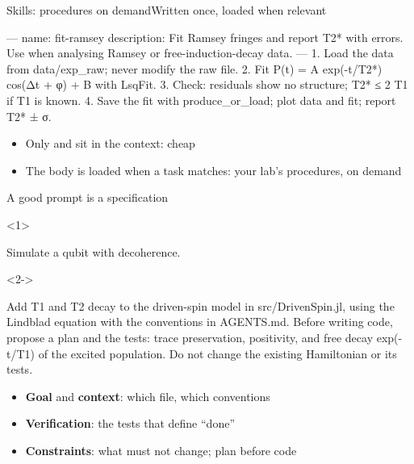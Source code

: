 \begin{frame}[fragile]{Skills: procedures on demand}{Written once, loaded when relevant}
\begin{terminal}[title={\hfill\tiny\color{unibasGrey}\smallcapsline{.claude/skills/fit-ramsey/SKILL.md}}]
---
name: fit-ramsey
description: Fit Ramsey fringes and report T2* with errors. Use when
  analysing Ramsey or free-induction-decay data.
---
1. Load the data from data/exp_raw; never modify the raw file.
2. Fit P(t) = A exp(-t/T2*) cos(Δt + φ) + B with LsqFit.
3. Check: residuals show no structure; T2* ≤ 2 T1 if T1 is known.
4. Save the fit with produce_or_load; plot data and fit; report T2* ± σ.
\end{terminal}
  \begin{itemize}
    \item<2-> Only  and  sit in the context: cheap
    \item<3-> The body is loaded when a task matches: your lab's procedures, on demand
  \end{itemize}
\end{frame}

\begin{frame}[fragile]{A good prompt is a specification}
\begin{onlyenv}<1>
\begin{prompt}
Simulate a qubit with decoherence.
\end{prompt}
\end{onlyenv}
\begin{onlyenv}<2->
\begin{prompt}
Add T1 and T2 decay to the driven-spin model in src/DrivenSpin.jl, using
the Lindblad equation with the conventions in AGENTS.md.
Before writing code, propose a plan and the tests: trace preservation,
positivity, and free decay exp(-t/T1) of the excited population.
Do not change the existing Hamiltonian or its tests.
\end{prompt}
\end{onlyenv}
  \begin{itemize}
    \item<2-> \textbf{Goal} and \textbf{context}: which file, which conventions
    \item<3-> \textbf{Verification}: the tests that define ``done''
    \item<4-> \textbf{Constraints}: what must not change; plan before code
  \end{itemize}
\end{frame}

